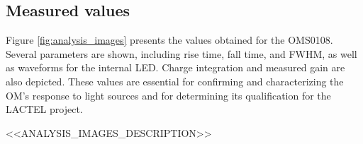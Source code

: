 \documentclass[a4paper,12pt]{article}
\newcommand{\OM}{OMS0108}
\begin{document}
	
	\subsection*{Measured values} 
	Figure \ref{fig:analysis_images} presents the values obtained for the \OM. Several parameters are shown, including rise time, fall time, and FWHM, as well as waveforms for the internal LED. Charge integration and measured gain are also depicted. These values are essential for confirming and characterizing the OM's response to light sources and for determining its qualification for the LACTEL project.
	
	
	
	\begin{itemize}
		\setlength\itemsep{1pt}  %
		<<ANALYSIS_IMAGES_DESCRIPTION>>
	\end{itemize}
	
\end{document}
